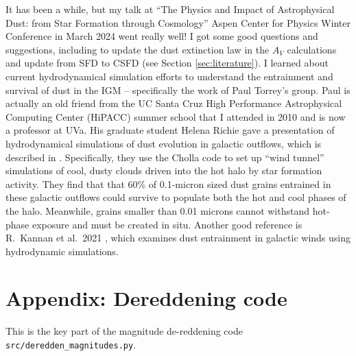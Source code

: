 \documentclass[11pt, oneside]{article}   	%
\begin{document}
It has been a while, but my talk at ``The Physics and Impact of Astrophysical Dust: from Star Formation through Cosmology'' Aspen Center for Physics Winter Conference in March 2024 went really well! I got some good questions and suggestions, including to update the dust extinction law in the $A_V$ calculations and update from SFD to CSFD (see Section \ref{sec:literature}). I learned about current hydrodynamical simulation efforts to understand the entrainment and survival of dust in the IGM -- specifically the work of Paul Torrey's group. Paul is actually an old friend from the UC Santa Cruz High Performance Astrophysical Computing Center (HiPACC) summer school that I attended in 2010 and is now a professor at UVa. His graduate student Helena Richie gave a presentation of hydrodynamical simulations of dust evolution in galactic outflows, which is described in \cite{2024ApJ...974...81R}. Specifically, they use the Cholla code to set up ``wind tunnel'' simulations of cool, dusty clouds driven into the hot halo by star formation activity. They find that that 60\% of 0.1-micron sized dust grains entrained in these galactic outflows could survive to populate both the hot and cool phases of the halo. Meanwhile, grains smaller than 0.01 microns cannot withstand hot-phase exposure and must be created in situ. Another good reference is R.~Kannan et al.~2021 \cite{2021MNRAS.503..336K}, which examines dust entrainment in galactic winds using hydrodynamic simulations.  %



\newpage
\appendix 

\section{Appendix: Dereddening code}\label{appx:deredden}
This is the key part of the magnitude de-reddening code \texttt{src/deredden\_magnitudes.py}. 
\end{document}
